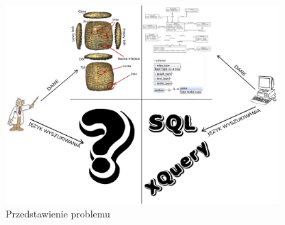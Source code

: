 \begin{figure}[h]
 \centering
 \includegraphics[width=400px]{../diagramy/poco.pdf}
 \caption{Przedstawienie problemu}
 \label{fig:poco}
\end{figure}

